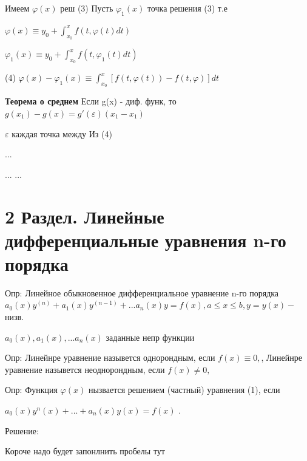 \documentclass{article}
\begin{document}
Имеем $\varphi(x)$ реш (3)
Пусть $\varphi_1(x)$ точка решения (3)
т.е 

$\varphi(x) \equiv y_0 + \int_{x_0}^{x}f(t,\varphi(t)dt)$

$\varphi_1(x) \equiv y_0 + \int_{x_0}^{x}f(t,\varphi_1(t)dt)$

(4) $\varphi(x) - \varphi_1(x) \equiv \int_{x_0}^{x} \left[f(t,\varphi(t)) - f(t,\varphi)\right]dt$







\textbf{Теорема о среднем}
Если g(x) - диф. функ,
то $g(x_1) - g(x) = g'(\varepsilon )(x_1-x_1)$

$\varepsilon$ каждая точка между
Из (4)



...

...
...

\section{2 Раздел. Линейные дифференциальные уравнения n-го порядка}

Опр: Линейное обыкновенное дифференциальное уравнение n-го порядка
$a_0(x)y^{(n)}+a_1(x)y^{(n-1)} + ... a_n (x)y = f(x), a\leq x\leq b, y=y(x) - $ низв.

$a_0(x),a_1(x),...a_n(x)$ заданные непр функции



Опр: Линейнре уравнение назывется однорондным, если $f(x) \equiv 0,$,
Линейнре уравнение назывется неоднорондным, если $f(x) \neq  0,$

Опр: Функция $\varphi(x)$ нызвается решением (частный) уравнения (1), если 

$a_0(x)y^n(x)+...+a_n(x)y(x) = f(x)  $ .

Решение:




Короче надо будет запонлнить пробелы тут
\end{document}
